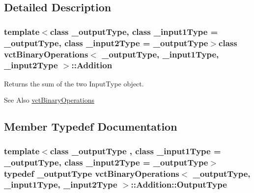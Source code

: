 \subsection{Detailed Description}
\subsubsection*{template$<$class \-\_\-output\-Type, class \-\_\-input1\-Type = \-\_\-output\-Type, class \-\_\-input2\-Type = \-\_\-output\-Type$>$class vct\-Binary\-Operations$<$ \-\_\-output\-Type, \-\_\-input1\-Type, \-\_\-input2\-Type $>$\-::\-Addition}

Returns the sum of the two Input\-Type object. 

\begin{DoxySeeAlso}{See Also}
\hyperlink{classvct_binary_operations}{vct\-Binary\-Operations} 
\end{DoxySeeAlso}


\subsection{Member Typedef Documentation}
\hypertarget{classvct_binary_operations_1_1_addition_a2de5d1a14345e7ff12fe79a822941a39}{
\subsubsection[{Output\-Type}]{\setlength{\rightskip}{0pt plus 5cm}template$<$class \-\_\-output\-Type , class \-\_\-input1\-Type  = \-\_\-output\-Type, class \-\_\-input2\-Type  = \-\_\-output\-Type$>$ typedef \-\_\-output\-Type {\bf vct\-Binary\-Operations}$<$ \-\_\-output\-Type, \-\_\-input1\-Type, \-\_\-input2\-Type $>$\-::{\bf Addition\-::\-Output\-Type}}}\label{classvct_binary_operations_1_1_addition_a2de5d1a14345e7ff12fe79a822941a39}


